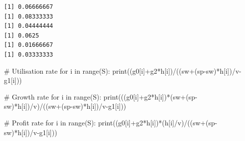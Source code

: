 \documentclass[
  letterpaper,
  DIV=11,
  numbers=noendperiod]{scrreprt}
\newenvironment{Shaded}{\begin{snugshade}}{\end{snugshade}}
\newcommand{\BuiltInTok}[1]{\textcolor[rgb]{0.00,0.23,0.31}{#1}}
\newcommand{\CommentTok}[1]{\textcolor[rgb]{0.37,0.37,0.37}{#1}}
\newcommand{\ControlFlowTok}[1]{\textcolor[rgb]{0.00,0.23,0.31}{#1}}
\newcommand{\KeywordTok}[1]{\textcolor[rgb]{0.00,0.23,0.31}{#1}}
\newcommand{\NormalTok}[1]{\textcolor[rgb]{0.00,0.23,0.31}{#1}}
\newcommand{\OperatorTok}[1]{\textcolor[rgb]{0.37,0.37,0.37}{#1}}
\begin{document}
\begin{verbatim}
[1] 0.06666667
[1] 0.08333333
[1] 0.04444444
[1] 0.0625
[1] 0.01666667
[1] 0.03333333
\end{verbatim}

\begin{tcolorbox}[enhanced jigsaw, titlerule=0mm, breakable, bottomrule=.15mm, toprule=.15mm, colbacktitle=quarto-callout-note-color!10!white, rightrule=.15mm, toptitle=1mm, opacityback=0, left=2mm, coltitle=black, title=\textcolor{quarto-callout-note-color}{\faInfo}\hspace{0.5em}{Python code}, colframe=quarto-callout-note-color-frame, opacitybacktitle=0.6, leftrule=.75mm, bottomtitle=1mm, arc=.35mm, colback=white]

\begin{Shaded}
\begin{Highlighting}[]
\CommentTok{\# Utilisation rate}
\ControlFlowTok{for}\NormalTok{ i }\KeywordTok{in} \BuiltInTok{range}\NormalTok{(S):}
    \BuiltInTok{print}\NormalTok{((g0[i]}\OperatorTok{+}\NormalTok{g2}\OperatorTok{*}\NormalTok{h[i])}\OperatorTok{/}\NormalTok{((sw}\OperatorTok{+}\NormalTok{(sp}\OperatorTok{{-}}\NormalTok{sw)}\OperatorTok{*}\NormalTok{h[i])}\OperatorTok{/}\NormalTok{v}\OperatorTok{{-}}\NormalTok{g1[i]))}

\CommentTok{\# Growth rate}
\ControlFlowTok{for}\NormalTok{ i }\KeywordTok{in} \BuiltInTok{range}\NormalTok{(S):}
    \BuiltInTok{print}\NormalTok{(((g0[i]}\OperatorTok{+}\NormalTok{g2}\OperatorTok{*}\NormalTok{h[i])}\OperatorTok{*}\NormalTok{(sw}\OperatorTok{+}\NormalTok{(sp}\OperatorTok{{-}}\NormalTok{sw)}\OperatorTok{*}\NormalTok{h[i])}\OperatorTok{/}\NormalTok{v)}\OperatorTok{/}\NormalTok{((sw}\OperatorTok{+}\NormalTok{(sp}\OperatorTok{{-}}\NormalTok{sw)}\OperatorTok{*}\NormalTok{h[i])}\OperatorTok{/}\NormalTok{v}\OperatorTok{{-}}\NormalTok{g1[i]))}
    
\CommentTok{\# Profit rate}
\ControlFlowTok{for}\NormalTok{ i }\KeywordTok{in} \BuiltInTok{range}\NormalTok{(S):}
    \BuiltInTok{print}\NormalTok{((g0[i]}\OperatorTok{+}\NormalTok{g2}\OperatorTok{*}\NormalTok{h[i])}\OperatorTok{*}\NormalTok{(h[i]}\OperatorTok{/}\NormalTok{v)}\OperatorTok{/}\NormalTok{((sw}\OperatorTok{+}\NormalTok{(sp}\OperatorTok{{-}}\NormalTok{sw)}\OperatorTok{*}\NormalTok{h[i])}\OperatorTok{/}\NormalTok{v}\OperatorTok{{-}}\NormalTok{g1[i]))}
\end{Highlighting}
\end{Shaded}

\end{tcolorbox}
\end{document}

